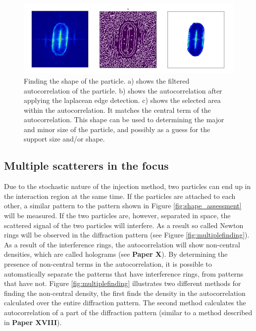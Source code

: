 \begin{figure}[!h]
\centering
\includegraphics[width=120mm]{Chapter_08_ImageClassification_Refined_Shape_Assessment2.png}
\caption{Finding the shape of the particle. a) shows the filtered autocorrelation of the particle. b) shows the autocorrelation after applying the laplacean edge detection. c) shows the selected area within the autocorrelation. It matches the central term of the autocorrelation. This shape can be used to determining the major and minor size of the particle, and possibly as a guess for the support size and/or shape. }\label{fig:detailed_shape_assessment}
\end{figure}


\subsection{Multiple scatterers in the focus}

Due to the stochastic nature of the injection method, two particles can end up in the interaction region at the same time. If the particles are attached to each other, a similar pattern to the pattern shown in Figure \ref{fig:shape_assessment} will be measured. If the two particles are, however, separated in space, the scattered signal of the two particles will interfere. As a result so called Newton rings will be observed in the diffraction pattern (see Figure \ref{fig:multiplefinding}). As a result of the interference rings, the autocorrelation will show non-central densities, which are called holograms (see \textbf{Paper X}). By determining the presence of non-central terms in the autocorrelation, it is possible to automatically separate the patterns that have interference rings, from patterns that have not. Figure \ref{fig:multiplefinding} illustrates two different methods for finding the non-central density, the first finds the density in the autocorrelation calculated over the entire diffraction pattern. The second method calculates the autocorrelation of a part of the diffraction pattern (similar to a method described in \textbf{Paper XVIII}).

